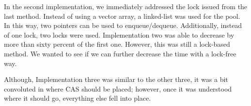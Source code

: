 \documentclass[letterpaper, 10 pt, conference]{IEEEconf}
\begin{document}
In the second implementation, we immediately addressed the lock issued from the last method. Instead of using a vector array, a linked-list was used for the pool. In this way, two pointers can be used to enqueue/dequeue. Additionally, instead of one lock, two locks were used. Implementation two was able to decrease by more than sixty percent of the first one. However, this was still a lock-based method. We wanted to see if we can further decrease the time with a lock-free way. 

Although, Implementation three was similar to the other three, it was a bit convoluted in where CAS should be placed; however, once it was understood where it should go, everything else fell into place. 

\end{document}
